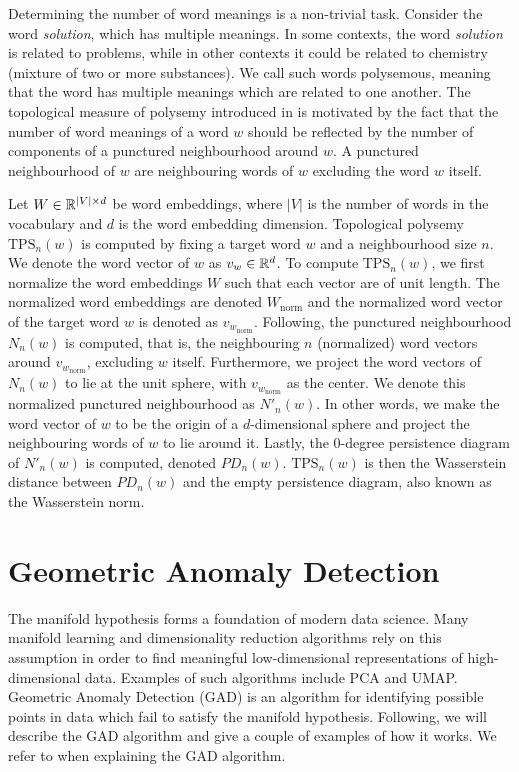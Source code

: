 Determining the number of word meanings is a non-trivial task. Consider the word \textit{solution}, which has multiple meanings. In some contexts, the word \textit{solution} is related to problems, while in other contexts it could be related to chemistry (mixture of two or more substances). We call such words polysemous, meaning that the word has multiple meanings which are related to one another. The topological measure of polysemy introduced in \cite{jakubowski2020topology} is motivated by the fact that the number of word meanings of a word $w$ should be reflected by the number of components of a punctured neighbourhood around $w$. A punctured neighbourhood of $w$ are neighbouring words of $w$ excluding the word $w$ itself.

Let $W \in \mathbb{R}^{|V| \times d}$ be word embeddings, where $|V|$ is the number of words in the vocabulary and $d$ is the word embedding dimension. Topological polysemy $\text{TPS}_n(w)$ is computed by fixing a target word $w$ and a neighbourhood size $n$. We denote the word vector of $w$ as $v_w \in \mathbb{R}^{d}$. To compute $\text{TPS}_n(w)$, we first normalize the word embeddings $W$ such that each vector are of unit length. The normalized word embeddings are denoted $W_\text{norm}$ and the normalized word vector of the target word $w$ is denoted as $v_{w_{\text{norm}}}$. Following, the punctured neighbourhood $N_n(w)$ is computed, that is, the neighbouring $n$ (normalized) word vectors around $v_{w_{\text{norm}}}$, excluding $w$ itself. Furthermore, we project the word vectors of $N_n(w)$ to lie at the unit sphere, with $v_{w_{\text{norm}}}$ as the center. We denote this normalized punctured neighbourhood as $N'_n(w)$. In other words, we make the word vector of $w$ to be the origin of a $d$-dimensional sphere and project the neighbouring words of $w$ to lie around it. Lastly, the 0-degree persistence diagram of $N'_n(w)$ is computed, denoted $PD_n(w)$. $\text{TPS}_n(w)$ is then the Wasserstein distance between $PD_n(w)$ and the empty persistence diagram, also known as the Wasserstein norm.

\section{Geometric Anomaly Detection}
\label{sec:geometric-anomaly-detection}
The manifold hypothesis forms a foundation of modern data science. Many manifold learning and dimensionality reduction algorithms rely on this assumption in order to find meaningful low-dimensional representations of high-dimensional data. Examples of such algorithms include PCA and UMAP. Geometric Anomaly Detection (GAD) \cite{stolz2020geometric} is an algorithm for identifying possible points in data which fail to satisfy the manifold hypothesis. Following, we will describe the GAD algorithm and give a couple of examples of how it works. We refer to \cite{stolz2020geometric} when explaining the GAD algorithm.

